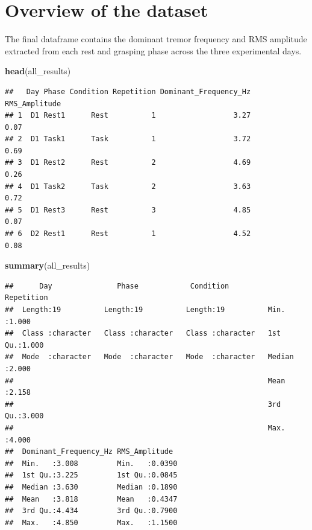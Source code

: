\documentclass[
]{article}
\newenvironment{Shaded}{\begin{snugshade}}{\end{snugshade}}
\newcommand{\FunctionTok}[1]{\textcolor[rgb]{0.13,0.29,0.53}{\textbf{#1}}}
\newcommand{\NormalTok}[1]{#1}
\begin{document}
\hypertarget{overview-of-the-dataset}{%
\section{Overview of the dataset}\label{overview-of-the-dataset}}

The final dataframe contains the dominant tremor frequency and RMS
amplitude extracted from each rest and grasping phase across the three
experimental days.

\begin{Shaded}
\begin{Highlighting}[]
\FunctionTok{head}\NormalTok{(all\_results)}
\end{Highlighting}
\end{Shaded}

\begin{verbatim}
##   Day Phase Condition Repetition Dominant_Frequency_Hz RMS_Amplitude
## 1  D1 Rest1      Rest          1                  3.27          0.07
## 2  D1 Task1      Task          1                  3.72          0.69
## 3  D1 Rest2      Rest          2                  4.69          0.26
## 4  D1 Task2      Task          2                  3.63          0.72
## 5  D1 Rest3      Rest          3                  4.85          0.07
## 6  D2 Rest1      Rest          1                  4.52          0.08
\end{verbatim}

\begin{Shaded}
\begin{Highlighting}[]
\FunctionTok{summary}\NormalTok{(all\_results)}
\end{Highlighting}
\end{Shaded}

\begin{verbatim}
##      Day               Phase            Condition           Repetition   
##  Length:19          Length:19          Length:19          Min.   :1.000  
##  Class :character   Class :character   Class :character   1st Qu.:1.000  
##  Mode  :character   Mode  :character   Mode  :character   Median :2.000  
##                                                           Mean   :2.158  
##                                                           3rd Qu.:3.000  
##                                                           Max.   :4.000  
##  Dominant_Frequency_Hz RMS_Amplitude   
##  Min.   :3.008         Min.   :0.0390  
##  1st Qu.:3.225         1st Qu.:0.0845  
##  Median :3.630         Median :0.1890  
##  Mean   :3.818         Mean   :0.4347  
##  3rd Qu.:4.434         3rd Qu.:0.7900  
##  Max.   :4.850         Max.   :1.1500
\end{verbatim}
\end{document}
